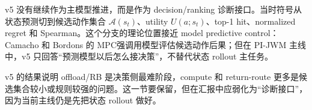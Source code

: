 \documentclass[UTF8,a4paper,11pt]{ctexart}
\newcommand{\code}[1]{\texttt{#1}}
\begin{document}
v5 没有继续作为主模型推进，而是作为 decision/ranking 诊断接口。当时符号从状态预测切到候选动作集合 $\mathcal{A}(s_t)$、utility $U(a;s_t)$、top-1 hit、normalized regret 和 Spearman。这个分支的理论位置接近 model predictive control：Camacho 和 Bordons 的 MPC强调用模型评估候选动作后果；但在 PI-JWM 主线中，v5 只回答“预测模型以后怎么接决策”，不替代状态 rollout 主任务。

\begin{table}[H]
\centering
\small
{}
\caption{v5 stage diagnostics 的 test split 最优读数，来源为 \code{world\_model\_v5\_stage\_diagnostics\_v0\_report.md}。}
\end{table}

\begin{table}[H]
\centering
\small
{}
\caption{v5 v3-to-v4 scale-up 摘要，来源为 \code{v3\_v4\_scaleup\_summary\_report.md}。}
\end{table}

v5 的结果说明 offload/RB 是决策侧最难阶段，compute 和 return-route 更多是候选集合较小或规则较强的问题。这一节要保留，但在汇报中应弱化为“诊断接口”，因为当前主线仍是先把状态 rollout 做好。
\end{document}
